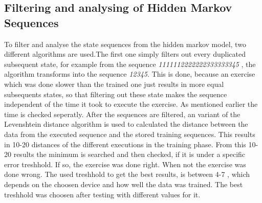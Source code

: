 \subsection{Filtering and analysing of Hidden Markov Sequences}

To filter and analyse the state sequences from the hidden markov model, two different algorithms are used.The first one simply filters out every duplicated subsequent state, for example from the sequence \textit{\small1111112222222333333345} , the algorithm transforms into the sequence \textit{\small12345}. This is done, because an exercise which was done slower than the trained one just results in more equal subsequents states, so that filtering out these state makes the sequence independent of the time it took to execute the exercise. As mentioned earlier the time is checked seperatly. %
\newline
\newline
After the sequences are filtered, an variant of the Levenshtein distance algorithm is used to calculated the distance between the data from the executed sequence and the stored training sequences. This results in 10-20 distances of the different executions in the training phase. From this 10-20 results the minimum is searched and then checked, if it is under a specific error treshhold. If so, the exercise was done right. When not the exercise was done wrong. The used treshhold to get the best results, is between 4-7 , which depends on the choosen device and how well the data was trained. The best treshhold was choosen after testing with different values for it.
